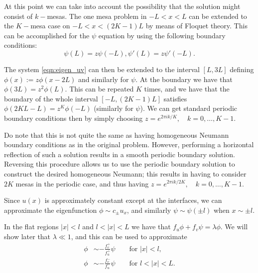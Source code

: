 \documentclass[a4paper,10pt]{article}
\newcommand{\lA}{\ensuremath{\lambda}}
\begin{document}
At this point we can take into account the possibility that the solution might consist of $k-$mesas. The one mesa problem in $-L<x<L$ can be extended to the $K-$mesa case on $-L<x<(2K-1)L$ by means of Floquet theory. This can be accomplished for the $\psi$ equation by using the following boundary conditions:
% 
\begin{equation*}
  \psi(L) = z\psi(-L),  \psi'(L) = z\psi'(-L).
\end{equation*}
% 

The system \eqref{eqn:eigen_uv} can then be extended to the interval $[L,3L]$ defining $\phi(x):=z\phi(x-2L)$ and similarly for $\psi$. At the boundary we have that $\phi(3L) = z^2\phi(L)$. This can be repeated $K$ times, and we have that the boundary of the whole interval $[-L,(2K-1)L]$ satisfies $\phi(2KL-L) = z^K\phi(-L)$ (similarly for $\psi$). We can get standard periodic boundary conditions then by simply choosing $z = e^{2\pi ik/K},\quad k = 0,\hdots,K-1$. 

Do note that this is not quite the same as having homogeneous Neumann boundary conditions as in the original problem. However, performing a horizontal reflection of such a solution results in a smooth periodic boundary solution. Reversing this procedure allows us to use the periodic boundary solution to construct the desired homogeneous Neumann; this results in having to consider $2K$ mesas in the periodic case, and thus having $z = e^{2\pi ik/2K},\quad k = 0,\hdots,K-1$.

Since $u(x)$ is approximately constant except at the interfaces, we can approximate the eigenfunction $\phi\sim c_{\pm}u_x$, and similarly $\psi\sim\psi(\pm l)$ when $x\sim\pm l$.

In the flat regions $|x|<l$ and $l<|x|<L$ we have that 	$f_u\phi + f_v\psi = \lA\phi$. We will show later that $\lA\ll 1$, and this can be used to approximate
% 
\begin{equation*}
\begin{split}
	\phi&\sim -\frac{f_v^+}{f_u^+}\psi\qquad\text{for }|x|<l,\\
	\phi&\sim -\frac{f_v^-}{f_u^-}\psi\qquad\text{for }l<|x|<L.
\end{split}
\end{equation*}
% 
\end{document}
